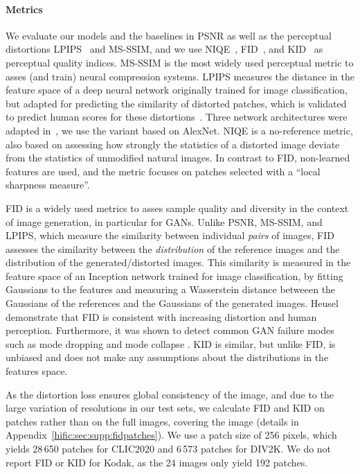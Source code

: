 \paragraph{Metrics}
We evaluate our models and the baselines in PSNR as well as the perceptual distortions LPIPS~\cite{zhang2018unreasonable} and MS-SSIM, and we use NIQE~\cite{mittal2012making}, FID~\cite{heusel2017gans}, and KID~\cite{binkowski2018demystifying} as perceptual quality indices. MS-SSIM is the most widely used perceptual metric to asses (and train) neural compression systems. 
LPIPS measures the distance in the feature space of a deep neural network originally trained for image classification, but adapted for predicting the similarity of distorted patches, 
which is validated to predict human scores for these distortions~\cite{zhang2018unreasonable}. Three network architectures were adapted in~\cite{zhang2018unreasonable}, we use the variant based on AlexNet.
NIQE is a no-reference metric, also based on assessing how strongly the statistics of a distorted image deviate from the statistics of unmodified natural images. 
In contrast to FID, non-learned features are used, and the metric focuses on patches selected with a ``local sharpness measure''.

FID is a widely used metrics to asses sample quality and diversity in the context of image generation, in particular for GANs. Unlike PSNR, MS-SSIM, and LPIPS, which measure the similarity between individual \emph{pairs} of images, FID assesses the similarity between the \emph{distribution} of the reference images and the distribution of the generated/distorted images. This similarity is measured in the feature space of an Inception network trained for image classification, by fitting Gaussians to the features and measuring a Wasserstein distance betweeen the Gaussians of the references and the Gaussians of the generated images. 
Heusel \etal~\cite{heusel2017gans} demonstrate that FID is consistent with increasing distortion and human perception. Furthermore, it was shown to detect common GAN failure modes such as mode dropping and mode collapse \cite{lucic2018gans}.
KID is similar, but unlike FID, is unbiased and does not make any assumptions about the distributions in the features space. 

As the distortion loss ensures global consistency of the image,
and due to the large variation of resolutions in our test sets, we calculate FID and KID on patches rather than on the full images, covering the image (details in Appendix~\ref{hific:sec:supp:fidpatches}).
We use a patch size of 256 pixels, which yields 28\,650 patches for CLIC2020 and 6\,573 patches for DIV2K. We do not report FID or KID for Kodak, as the 24 images only yield 192 patches.  


